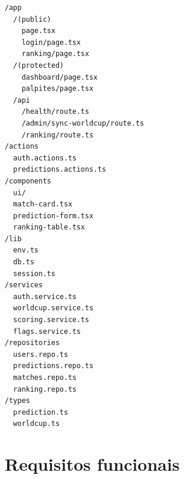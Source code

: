 \documentclass[12pt,a4paper]{article}
\begin{document}
\begin{lstlisting}[language={},caption={Estrutura inicial do projeto}]
/app
  /(public)
    page.tsx
    login/page.tsx
    ranking/page.tsx
  /(protected)
    dashboard/page.tsx
    palpites/page.tsx
  /api
    /health/route.ts
    /admin/sync-worldcup/route.ts
    /ranking/route.ts
/actions
  auth.actions.ts
  predictions.actions.ts
/components
  ui/
  match-card.tsx
  prediction-form.tsx
  ranking-table.tsx
/lib
  env.ts
  db.ts
  session.ts
/services
  auth.service.ts
  worldcup.service.ts
  scoring.service.ts
  flags.service.ts
/repositories
  users.repo.ts
  predictions.repo.ts
  matches.repo.ts
  ranking.repo.ts
/types
  prediction.ts
  worldcup.ts
\end{lstlisting}

\section{Requisitos funcionais}
\end{document}
